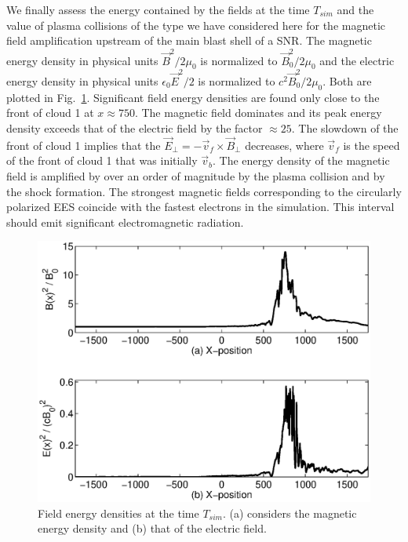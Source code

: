 \documentclass[structabstract]{aa}
\begin{document}
We finally assess the energy contained by the fields at the time $T_{sim}$ 
and the value of plasma collisions of the type we have considered here for 
the magnetic field amplification upstream of the main blast shell of a SNR. 
The magnetic energy density in physical units $\vec{B}^2 / 2\mu_0$ is 
normalized to $\vec{B}_0^2 / 2\mu_0$ and the electric energy density in 
physical units $\epsilon_0 \vec{E}^2/2$ is normalized to $c^2\vec{B}_0^2 / 
2\mu_0$. Both are plotted in Fig.~\ref{Fig18}. Significant field energy 
densities are found only close to the front of cloud 1 at $x\approx 750$. 
The magnetic field dominates and its peak energy density exceeds that of 
the electric field by the factor $\approx 25$. The slowdown of the front 
of cloud 1 implies that the $\vec{E}_\perp = -\vec{v}_f \times \vec{B}_\perp$ 
decreases, where $\vec{v}_f$ is the speed of the front of cloud 1 that was 
initially $\vec{v}_b$. The energy density of the magnetic field is amplified 
by over an order of magnitude by the plasma collision and by the shock 
formation. The strongest magnetic fields corresponding to the circularly 
polarized EES coincide with the fastest electrons in the simulation. This 
interval should emit significant electromagnetic radiation.

\begin{figure}
\centering
\includegraphics[width=\columnwidth]{Fig18.eps}
\caption{Field energy densities at the time $T_{sim}$. (a) considers the 
magnetic energy density and (b) that of the electric field.}\label{Fig18}
\end{figure}
\end{document}

